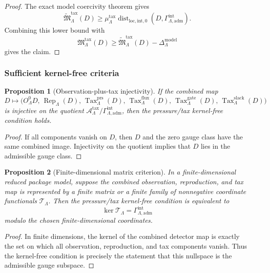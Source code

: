 \documentclass[11pt]{article}
\numberwithin{equation}{section}
\newtheorem{proposition}[proposition]{Proposition}
\theoremstyle{definition}
\theoremstyle{remark}
\newcommand{\loc}{\mathrm{loc}}
\newcommand{\intg}{\mathrm{int}}
\newcommand{\adm}{\mathrm{adm}}
\newcommand{\prs}{\mathrm{prs}}
\newcommand{\Dist}{\operatorname{dist}}
\newcommand{\Gammaadm}{\Gamma^{\intg}_{\Lambda,\adm}}
\begin{document}
\begin{proof}
The exact model coercivity theorem gives
\[
    \widetilde{\mathfrak M}^{\mathrm{tax}}_\Lambda(D)
    \ge
    \mu^{\mathrm{tax}}_\Lambda
    \Dist_{\loc,\intg,0}(D,\Gammaadm).
\]
Combining this lower bound with
\[
    \mathfrak M^{\mathrm{tax}}_\Lambda(D)
    \ge
    \widetilde{\mathfrak M}^{\mathrm{tax}}_\Lambda(D)
    -
    \Delta^{\mathrm{model}}_\Lambda
\]
gives the claim.
\end{proof}

\subsubsection{Sufficient kernel-free criteria}

\begin{proposition}[Observation-plus-tax injectivity]
\label{prop:observation-tax-injectivity}
If the combined map
\[
    D\mapsto
    \bigl(
        O^0_\Lambda D,\,
        \operatorname{Rep}_\Lambda(D),\,
        \operatorname{Tax}^{\prs}_\Lambda(D),\,
        \operatorname{Tax}^{\mathrm{flux}}_\Lambda(D),\,
        \operatorname{Tax}^{\mathrm{gate}}_\Lambda(D),\,
        \operatorname{Tax}^{\mathrm{slack}}_\Lambda(D)
    \bigr)
\]
is injective on the quotient
\(\mathcal A^{\mathrm{tax}}_\Lambda/\Gammaadm\), then the pressure/tax
kernel-free condition holds.
\end{proposition}

\begin{proof}
If all components vanish on \(D\), then \(D\) and the zero gauge
class have the same combined image.  Injectivity on the quotient implies
that \(D\) lies in the admissible gauge class.
\end{proof}

\begin{proposition}[Finite-dimensional matrix criterion]
\label{prop:finite-dimensional-matrix-kernel}
In a finite-dimensional reduced package model, suppose the combined
observation, reproduction, and tax map is represented by a finite matrix or a
finite family of nonnegative coordinate functionals \(\mathcal T_\Lambda\).
Then the pressure/tax kernel-free condition is equivalent to
\[
    \ker\mathcal T_\Lambda=\Gammaadm
\]
modulo the chosen finite-dimensional coordinates.
\end{proposition}

\begin{proof}
In finite dimensions, the kernel of the combined detector map is exactly the
set on which all observation, reproduction, and tax components vanish.  Thus
the kernel-free condition is precisely the statement that this nullspace is
the admissible gauge subspace.
\end{proof}
\end{document}
